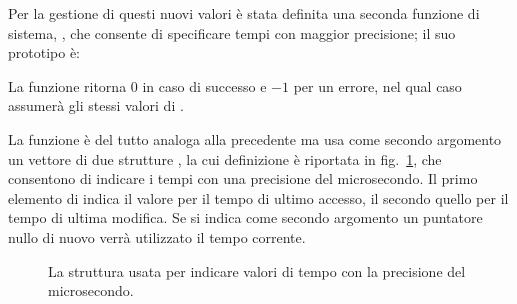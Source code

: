 Per la gestione di questi nuovi valori è stata definita una seconda funzione
di sistema, , che consente di specificare tempi con maggior
precisione; il suo prototipo è:

\begin{funcproto}{
}
{La funzione ritorna $0$ in caso di successo e $-1$ per un errore, nel qual
  caso  assumerà gli stessi valori di .}  
\end{funcproto}
 
La funzione è del tutto analoga alla precedente  ma usa come
secondo argomento un vettore di due strutture , la cui
definizione è riportata in fig.~\ref{fig:sys_timeval_struct}, che consentono
di indicare i tempi con una precisione del microsecondo. Il primo elemento
di  indica il valore per il tempo di ultimo accesso, il secondo
quello per il tempo di ultima modifica. Se si indica come secondo argomento un
puntatore nullo di nuovo verrà utilizzato il tempo corrente.

\begin{figure}[!htb]
  \footnotesize \centering
  \begin{minipage}[c]{0.8\textwidth}
  \end{minipage} 
  \normalsize 
  \caption{La struttura  usata per indicare valori di tempo
    con la precisione del microsecondo.}
  \label{fig:sys_timeval_struct}
\end{figure}





